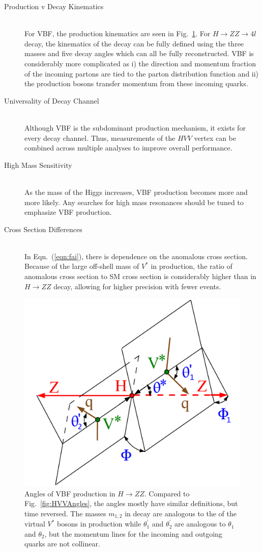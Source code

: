 \begin{description}
\item[Production v Decay Kinematics] \hfill \\
For VBF, the production kinematics are seen in Fig.~\ref{fig:VBFAngles}. For $H\rightarrow ZZ \rightarrow 4l$ decay, the kinematics of the decay can be fully defined using the three masses and five decay angles which can all be fully reconstructed. VBF is considerably more complicated as i) the direction and momentum fraction of the incoming partons are tied to the parton distribution function and ii) the production bosons transfer momentum from these incoming quarks.
\item[Universality of Decay Channel] \hfill \\
Although VBF is the subdominant production mechanism, it exists for every decay channel. Thus, measurements of the $HVV$ vertex can be combined across multiple analyses to improve overall performance.
\item[High Mass Sensitivity] \hfill \\
As the mass of the Higgs increases, VBF production becomes more and more likely. Any searches for high mass resonances should be tuned to emphasize VBF production.
\item[Cross Section Differences] \hfill \\
In Eqn.~(\ref{eqn:fai}), there is dependence on the anomalous cross section. Because of the large off-shell mass of $V^*$ in production, the ratio of anomalous cross section to SM cross section is considerably higher than in $H\rightarrow ZZ$ decay, allowing for higher precision with fewer events.
\end{description}

\begin{figure}[htbp]
\begin{center}
\includegraphics[width=.5\linewidth]{Phenomenology/figures/angles-HZZVBF_cms.pdf}
\caption[Definition of Angles in VBF Production]{Angles of VBF production in $H\rightarrow ZZ$. Compared to Fig.~\ref{fig:HVVAngles}, the angles mostly have similar definitions, but time reversed. The masses $m_{1,2}$ in decay are analogous to the  of the virtual $V^*$ bosons in production while $\theta_1^{'}$ and $\theta_2^{'}$ are analogous to $\theta_1$ and $\theta_2$, but the momentum lines for the incoming and outgoing quarks are not collinear.}
\label{fig:VBFAngles}
\end{center}
\end{figure}

